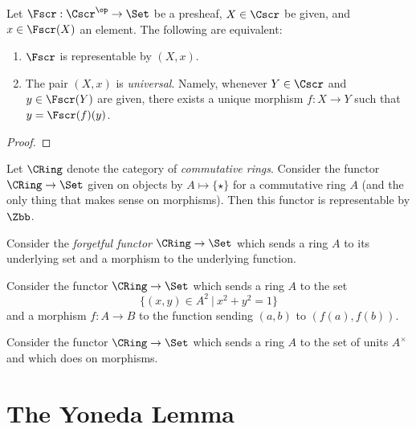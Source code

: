 \begin{theorem}
  Let $\Fscr : \Cscr^{\op} \to \Set$ be a presheaf, $X \in \Cscr$ be given, and $x \in \Fscr(X)$ an element.
  The following are equivalent:
  \begin{enumerate}
    \item $\Fscr$ is representable by $(X,x)$.
    \item The pair $(X,x)$ is \emph{universal}.
          Namely, whenever $Y \in \Cscr$ and $y \in \Fscr(Y)$ are given, there exists a unique morphism $f : X \to Y$ such that $y = \Fscr(f)(y)$.
  \end{enumerate}
\end{theorem}
\begin{proof}
\end{proof}


\begin{example}
  Let $\CRing$ denote the category of \emph{commutative rings}.
  Consider the functor $\CRing \to \Set$ given on objects by $A \mapsto \{\star\}$ for a commutative ring $A$ (and the only thing that makes sense on morphisms).
  Then this functor is representable by $\Zbb$.
\end{example}

\begin{example}
  Consider the \emph{forgetful functor} $\CRing \to \Set$ which sends a ring $A$ to its underlying set and a morphism to the underlying function.
\end{example}

\begin{example}
  Consider the functor $\CRing \to \Set$ which sends a ring $A$ to the set
  \[ \{ (x,y) \in A^{2} \ | \ x^{2} + y^{2} = 1 \} \]
  and a morphism $f : A \to B$ to the function sending $(a,b)$ to $(f(a),f(b))$.
\end{example}

\begin{example}
  Consider the functor $\CRing \to \Set$ which sends a ring $A$ to the set of units $A^{\times}$ and which does  on morphisms.
\end{example}

\section{The Yoneda Lemma}

